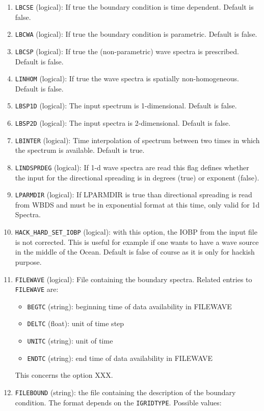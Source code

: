 \documentclass[12pt]{amsart}
\begin{document}
\begin{enumerate}
\item {\tt LBCSE} (logical): If true the boundary condition is time dependent. Default is false.
\item {\tt LBCWA} (logical): If true the boundary condition is parametric. Default is false.
\item {\tt LBCSP} (logical): If true the (non-parametric) wave spectra is prescribed. Default is false.
\item {\tt LINHOM} (logical): If true the wave spectra is spatially non-homogeneous. Default is false.
\item {\tt LBSP1D} (logical): The input spectrum is 1-dimensional. Default is false.
\item {\tt LBSP2D} (logical): The input spectra is 2-dimensional. Default is false.
\item {\tt LBINTER} (logical): Time interpolation of spectrum between two times in which the spectrum is available. Default is true.
\item {\tt LINDSPRDEG} (logical): If 1-d wave spectra are read this flag defines whether the input for the directional spreading is in degrees (true) or exponent (false).
\item {\tt LPARMDIR} (logical): If LPARMDIR is true than directional spreading is read from WBDS and must be in exponential format at this time, only valid for 1d Spectra.
\item {\tt HACK\_HARD\_SET\_IOBP} (logical): with this option, the IOBP from the input file is not corrected. This is useful for example if one wants to have a wave source in the middle of the Ocean. Default is false of course as it is only for hackish purpose.
\item {\tt FILEWAVE} (logical): File containing the boundary spectra. Related entries to {\tt FILEWAVE} are:
  \begin{itemize}
  \item {\tt BEGTC} (string): beginning time of data availability in FILEWAVE
  \item {\tt DELTC} (float): unit of time step
  \item {\tt UNITC} (string): unit of time
  \item {\tt ENDTC} (string): end time of data availability in FILEWAVE
  \end{itemize}
  This concerns the option XXX.
\item {\tt FILEBOUND} (string): the file containing the description of the boundary condition. The format depends on the {\tt IGRIDTYPE}. Possible values:

\end{enumerate}
\end{document}
